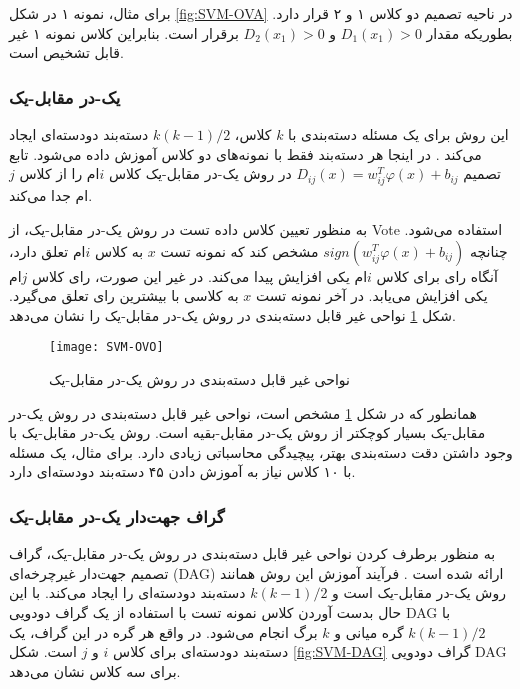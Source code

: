 برای مثال، نمونه ۱ در شکل \ref{fig:SVM-OVA} در ناحیه تصمیم دو کلاس ۱ و ۲ قرار دارد. بطوریکه مقدار $D_{1}(x_{1}) > 0$  و $D_{2}(x_{1}) > 0$ برقرار است. بنابراین کلاس نمونه ۱ غیر قابل تشخیص است.  

\subsubsection{یک-در مقابل-یک}\label{sec:2:1:5:2}
این روش برای یک مسئله دسته‌بندی با $k$ کلاس، $k(k-1)/2$ دسته‌بند دودسته‌ای ایجاد می‌کند \cite{hsu2002}. در اینجا هر دسته‌بند فقط با نمونه‌های دو کلاس آموزش داده می‌شود. تابع تصمیم $D_{ij}(x) = w^{T}_{ij}\varphi(x) + b_{ij}$  در روش یک-در مقابل-یک کلاس $i$ام را از کلاس $j$ام جدا می‌کند.

به منظور تعیین کلاس داده تست در روش یک-در مقابل-یک، از \gls{Vote} استفاده می‌شود. چنانچه $sign(w^{T}_{ij}\varphi(x) + b_{ij})$ مشخص کند که نمونه تست $x$ به کلاس $i$ام تعلق دارد، آنگاه رای برای کلاس $i$ام یکی افزایش پیدا می‌کند. در غیر این صورت، رای کلاس $j$ام یکی افزایش می‌یابد. در آخر نمونه تست $x$ به کلاسی با بیشترین رای تعلق می‌گیرد. شکل \ref{fig:SVM-OVO} نواحی غیر قابل دسته‌بندی در روش یک-در مقابل-یک را نشان می‌دهد.

\begin{figure}[!t]
	\centering
	\texttt{[image: SVM-OVO]}
	\caption[نواحی غیر قابل دسته‌بندی در روش یک-در مقابل-یک]{نواحی غیر قابل دسته‌بندی در روش یک-در مقابل-یک \cite{shigeo2005}}
	\label{fig:SVM-OVO}
\end{figure}

همانطور که در شکل \ref{fig:SVM-OVO} مشخص است، نواحی غیر قابل دسته‌بندی در روش یک-در مقابل-یک بسیار کوچکتر از روش یک-در مقابل-بقیه است. روش یک-در مقابل-یک با وجود داشتن دقت دسته‌بندی بهتر، پیچیدگی محاسباتی زیادی دارد. برای مثال‌، یک مسئله با ۱۰ کلاس نیاز به آموزش دادن ۴۵ دسته‌بند دودسته‌ای دارد. 

\subsubsection{گراف جهت‌دار یک-در مقابل-یک}\label{sec:2:1:6}
به منظور برطرف کردن نواحی غیر قابل دسته‌بندی در روش یک-در مقابل-یک، گراف تصمیم جهت‌دار غیرچرخه‌ای (\gls{DAG}) ارائه شده است \cite{platt2000}. فرآیند آموزش این روش همانند روش یک-در مقابل-یک است و $k(k-1)/2$ دسته‌بند دودسته‌ای را ایجاد می‌کند. با این حال بدست آوردن کلاس نمونه تست با استفاده از یک گراف دودویی \gls*{DAG} با $k(k-1)/2$ گره میانی و $k$ برگ انجام می‌شود. در واقع هر گره در این گراف،  یک دسته‌بند دودسته‌ای برای کلاس $i$ و $j$ است. شکل \ref{fig:SVM-DAG} گراف دودویی \gls*{DAG} برای سه کلاس نشان می‌دهد.

